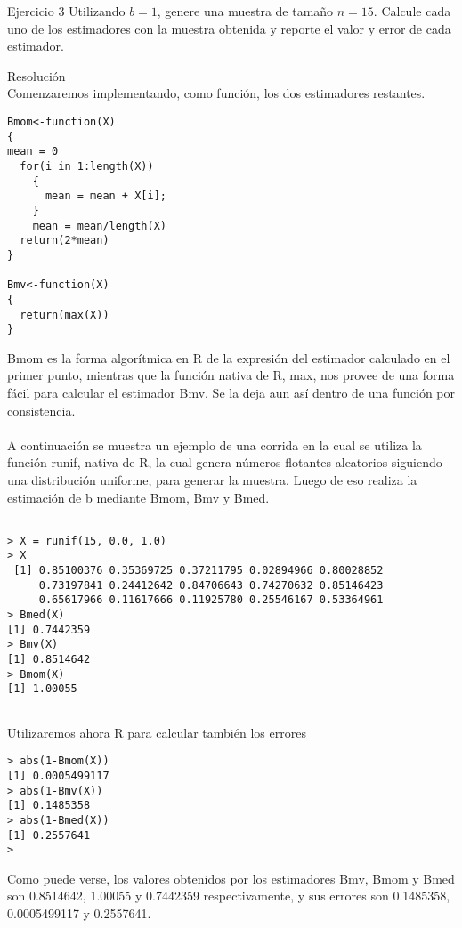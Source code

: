 



\begin{section}{Ejercicio 3}
Utilizando $b = 1$, genere una muestra de tamaño $n = 15$. Calcule cada uno de los estimadores con la muestra obtenida y reporte el valor y error de cada estimador.

\begin{subsection}{Resolución}~\\
Comenzaremos implementando, como función, los dos estimadores restantes.


\begin{verbatim}
Bmom<-function(X)
{
mean = 0
  for(i in 1:length(X))
    { 
      mean = mean + X[i];
    }
    mean = mean/length(X)
  return(2*mean)
}

Bmv<-function(X)
{
  return(max(X))
}
\end{verbatim}


Bmom es la forma algorítmica en R de la expresión del estimador calculado en el primer punto, mientras que la función nativa de R, max, nos provee de una forma fácil para calcular el estimador Bmv. Se la deja aun así dentro de una función por consistencia.\\
\\
A continuación se muestra un ejemplo de una corrida en la cual se utiliza la función runif, nativa de R, la cual genera números flotantes aleatorios siguiendo una distribución uniforme, para generar la muestra. Luego de eso realiza  la estimación de b mediante Bmom, Bmv y Bmed.


\begin{verbatim}

> X = runif(15, 0.0, 1.0)
> X
 [1] 0.85100376 0.35369725 0.37211795 0.02894966 0.80028852
     0.73197841 0.24412642 0.84706643 0.74270632 0.85146423
     0.65617966 0.11617666 0.11925780 0.25546167 0.53364961
> Bmed(X)
[1] 0.7442359
> Bmv(X)
[1] 0.8514642
> Bmom(X)
[1] 1.00055


\end{verbatim}

Utilizaremos ahora R para calcular también los errores

\begin{verbatim}
> abs(1-Bmom(X))
[1] 0.0005499117
> abs(1-Bmv(X))
[1] 0.1485358
> abs(1-Bmed(X))
[1] 0.2557641
> 
\end{verbatim}

Como puede verse, los valores obtenidos por los estimadores Bmv, Bmom y Bmed son 0.8514642, 1.00055 y 0.7442359 respectivamente, y sus errores son 0.1485358, 0.0005499117 y 0.2557641.


\end{subsection}
\end{section}